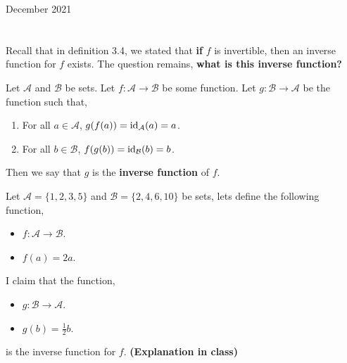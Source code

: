\documentclass[12pt,oneside]{book} %
\begin{document}
	\renewcommand*{\term}{Term 2} %
	\renewcommand*{\coursecode}{MCR3U} %
	\renewcommand*{\coursename}{Course Name} %
	\renewcommand*{\thelecnum}{4} %
	\renewcommand*{\profname}{Prof Name} %
	\renewcommand*{\colink}{http://www.student.math.uwaterloo.ca/~c2kent} %
	\clearpage
	\pagestyle{classlecture}
\begin{lec}{December 2021}
	\chapter{\chapname\chaplec}
Recall that in definition 3.4, we stated that \textbf{if} $f$ is invertible, then an inverse function for $f$ exists. The question
remains, \textbf{what is this inverse function?}

\begin{defn}
    Let $\mathcal{A}$ and $\mathcal{B}$ be sets. Let $f \colon \mathcal{A} \to \mathcal{B}$ be some function. Let $g \colon \mathcal{B} \to \mathcal{A}$
    be the function such that,
    \begin{enumerate}
      \item For all $a \in \mathcal{A}$, $g(f(a))= \operatorname{id}_\mathcal{A}(a) = a$.
      \item For all $b \in \mathcal{B}$, $f(g(b)) = \operatorname{id}_\mathcal{B}(b) = b$.
    \end{enumerate}
    Then we say that $g$ is the \textbf{inverse function} of $f$.
\end{defn}


\begin{ex}
  Let $ \mathcal{A} = \{1,2,3,5\} $ and $ \mathcal{B} = \{2,4,6,10\} $ be sets, lets define the
  following function, 
  \begin{itemize}
    \item $f \colon \mathcal{A} \to \mathcal{B}$.
    \item $f(a) = 2a$.
  \end{itemize}
  I claim that the function,
  \begin{itemize}
    \item $g \colon \mathcal{B} \to \mathcal{A}$.
    \item $g(b) = \frac{1}{2}b$.
  \end{itemize}
  is the inverse function for $f$. \textbf{(Explanation in class)}
\end{ex}


\end{lec}
\end{document}
